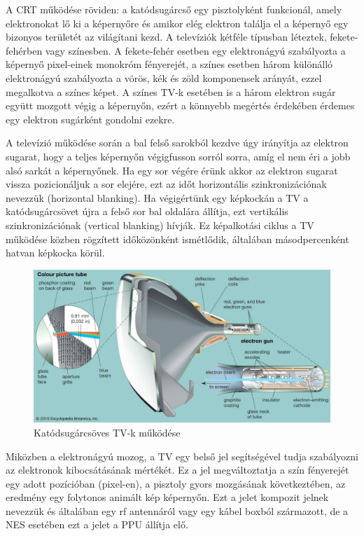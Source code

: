 	A CRT működése röviden: a katódsugárcső egy pisztolyként funkcionál, amely elektronokat lő ki a képernyőre és amikor elég elektron találja el a képernyő egy bizonyos területét az világítani kezd. A televíziók kétféle típusban léteztek, fekete-fehérben vagy színesben. A fekete-fehér esetben egy elektronágyú szabályozta a képernyő pixel-einek monokróm fényerejét, a színes esetben három különálló elektronágyú szabályozta a vörös, kék és zöld komponensek arányát, ezzel megalkotva a színes képet. A színes TV-k esetében is a három elektron sugár együtt mozgott végig a képernyőn, ezért a könnyebb megértés érdekében érdemes egy elektron sugárként gondolni ezekre. 
	
	A televízió működése során a bal felső sarokból kezdve úgy irányítja az elektron sugarat, hogy a teljes képernyőn végigfusson sorról sorra, amíg el nem éri a jobb alsó sarkát a képernyőnek. Ha egy sor végére érünk akkor az elektron sugarat vissza pozicionáljuk a sor elejére, ezt az időt horizontális szinkronizációnak nevezzük (horizontal blanking). Ha végigértünk egy képkockán a TV a katódsugárcsövet újra a felső sor bal oldalára állítja, ezt vertikális szinkronizációnak (vertical blanking) hívják. Ez képalkotási ciklus a TV működése közben rögzített időközönként ismétlődik, általában másodpercenként hatvan képkocka körül. 
	
	\begin{figure}[H]
		\centering
		\includegraphics[width=150mm, keepaspectratio]{figures/CRT-TV}
		\caption{Katódsugárcsöves TV-k működése}
		\label{fig:CRT-TV}
	\end{figure}
	
	Miközben a elektronágyú mozog, a TV egy belső jel segítségével tudja szabályozni az elektronok kibocsátásának mértékét. Ez a jel megváltoztatja a szín fényerejét egy adott pozícióban (pixel-en), a pisztoly gyors mozgásának következtében, az eredmény egy folytonos animált kép képernyőn. Ezt a jelet kompozit jelnek nevezzük és általában egy rf antennáról vagy egy kábel boxból származott, de a NES esetében ezt a jelet a PPU állítja elő. 
	
